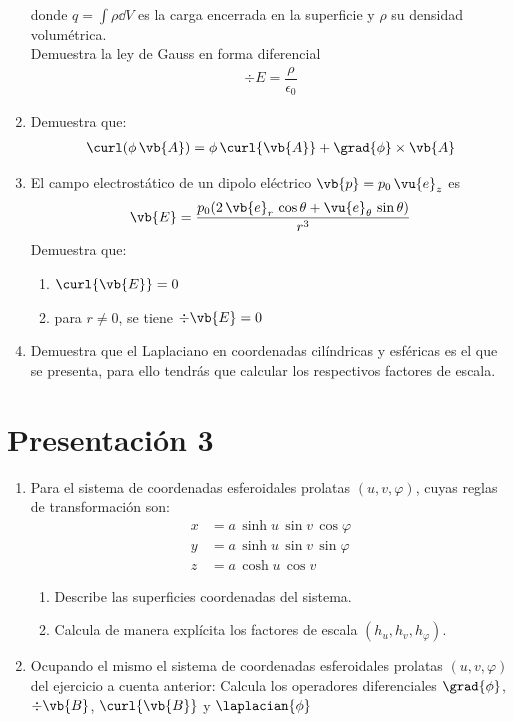 \begin{enumerate}
\begin{align*}
\end{align*}
donde $q = \displaystyle \int \rho \dd{V}$ es la carga encerrada en la superficie y $\rho$ su densidad volumétrica.
\\
\bigskip
Demuestra la ley de Gauss en forma diferencial
\begin{align*}
\div{E} = \dfrac{\rho}{\epsilon_{0}}
\end{align*}
\item Demuestra que:
\begin{align*}
\curl(\phi \, \vb{A}) = \phi \, \curl{\vb{A}} + \grad{\phi} \times \vb{A}
\end{align*}
\item El campo electrostático de un dipolo eléctrico $\vb{p} = p_{0} \, \vu{e}_{z}$ es
\begin{align*}
\vb{E} = \dfrac{p_{0} (2 \, \vb{e}_{r} \, \cos \theta + \vu{e}_{\theta} \, \sin \theta)}{r^{3}}
\end{align*}
Demuestra que:
\begin{enumerate}
\item $\curl{\vb{E}} = 0$
\item para $r \neq 0$, se tiene $\div{\vb{E}} = 0$
\end{enumerate}
\item Demuestra que el Laplaciano en coordenadas cilíndricas y esféricas es el que se presenta, para ello tendrás que calcular los respectivos factores de escala.
\end{enumerate}
\section{Presentación 3}
\begin{enumerate}
\item  Para el sistema de coordenadas esferoidales prolatas $(u, v, \varphi)$, cuyas reglas de transformación son:
\begin{align*}
x &= a \, \sinh u \, \sin v \, \cos \varphi \\
y &= a \, \sinh u \, \sin v \, \sin \varphi \\
z &= a \, \cosh u \, \cos v
\end{align*}
\begin{enumerate}
\item Describe las superficies coordenadas del sistema.
\item Calcula de manera explícita los factores de escala $(h_{u}, h_{v}, h_{\varphi})$.
\end{enumerate}
\item Ocupando el mismo el sistema de coordenadas esferoidales prolatas $(u, v, \varphi)$ del ejercicio a cuenta anterior: Calcula los operadores diferenciales $\grad{\phi}$, $\div{\vb{B}}$, $\curl{\vb{B}}$ y $\laplacian{\phi}$
\end{enumerate}
